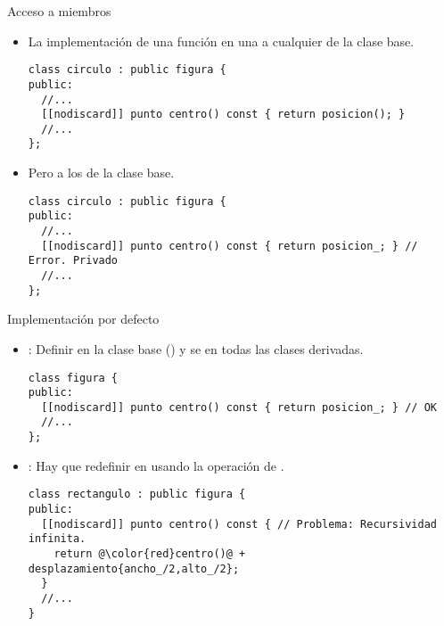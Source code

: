 \begin{frame}[t,fragile]{Acceso a miembros}
\begin{itemize}
  \item La implementación de una función en una 
         a cualquier  de la clase base.
\begin{lstlisting}
class circulo : public figura {
public:
  //...
  [[nodiscard]] punto centro() const { return posicion(); }
  //...
};
\end{lstlisting}

  \item Pero  a los 
        de la clase base.
\begin{lstlisting}
class circulo : public figura {
public:
  //...
  [[nodiscard]] punto centro() const { return posicion_; } // Error. Privado
  //...
};
\end{lstlisting}

\end{itemize}
\end{frame}

\begin{frame}[t,fragile]{Implementación por defecto}
\begin{itemize}
  \item {}: Definir  
        en la clase base ()
        y se  en todas las clases derivadas.
\begin{lstlisting} 
class figura {
public:
  [[nodiscard]] punto centro() const { return posicion_; } // OK
  //...
};
\end{lstlisting}

  \item {}: Hay que redefinir 
        en  usando la operación  de .
\begin{lstlisting}[escapechar=@]
class rectangulo : public figura {
public:
  [[nodiscard]] punto centro() const { // Problema: Recursividad infinita.
    return @\color{red}centro()@ + desplazamiento{ancho_/2,alto_/2};
  }
  //...
}
\end{lstlisting}

\end{itemize}
\end{frame}

